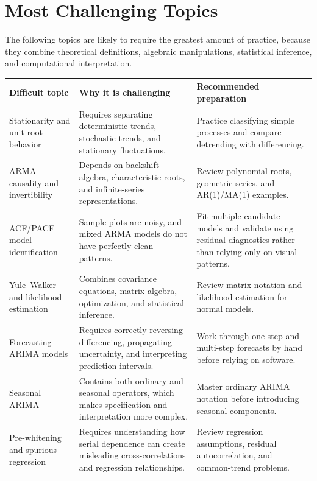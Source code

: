\documentclass[11pt]{article}
\begin{document}
\section{Most Challenging Topics}

The following topics are likely to require the greatest amount of practice,
because they combine theoretical definitions, algebraic manipulations,
statistical inference, and computational interpretation.

\begin{longtable}{p{} p{} p{}}
\toprule
\textbf{Difficult topic} & \textbf{Why it is challenging} & \textbf{Recommended preparation} \\
\midrule
\endhead

Stationarity and unit-root behavior &
Requires separating deterministic trends, stochastic trends, and stationary
fluctuations. &
Practice classifying simple processes and compare detrending with
differencing. \\

ARMA causality and invertibility &
Depends on backshift algebra, characteristic roots, and infinite-series
representations. &
Review polynomial roots, geometric series, and AR(1)/MA(1) examples. \\

ACF/PACF model identification &
Sample plots are noisy, and mixed ARMA models do not have perfectly clean
patterns. &
Fit multiple candidate models and validate using residual diagnostics rather
than relying only on visual patterns. \\

Yule--Walker and likelihood estimation &
Combines covariance equations, matrix algebra, optimization, and statistical
inference. &
Review matrix notation and likelihood estimation for normal models. \\

Forecasting ARIMA models &
Requires correctly reversing differencing, propagating uncertainty, and
interpreting prediction intervals. &
Work through one-step and multi-step forecasts by hand before relying on
software. \\

Seasonal ARIMA &
Contains both ordinary and seasonal operators, which makes specification and
interpretation more complex. &
Master ordinary ARIMA notation before introducing seasonal components. \\

Pre-whitening and spurious regression &
Requires understanding how serial dependence can create misleading
cross-correlations and regression relationships. &
Review regression assumptions, residual autocorrelation, and common-trend
problems. \\


\end{longtable}
\end{document}
